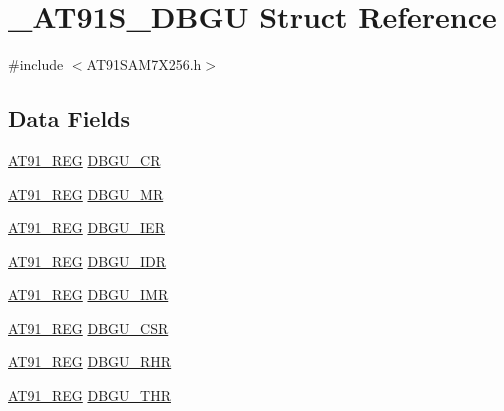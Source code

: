 \hypertarget{struct__AT91S__DBGU}{\section{\-\_\-\-A\-T91\-S\-\_\-\-D\-B\-G\-U Struct Reference}
\label{struct__AT91S__DBGU}
}


{\ttfamily \#include $<$A\-T91\-S\-A\-M7\-X256.\-h$>$}

\subsection*{Data Fields}
\begin{DoxyCompactItemize}
\item 
\hyperlink{GCC_2ARM7__AT91SAM7S_2AT91SAM7X256_8h_a712ad5a1ac1bd02f3e95a7526c283ce1}{A\-T91\-\_\-\-R\-E\-G} \hyperlink{struct__AT91S__DBGU_ac0ec2f327fe14ffd3d8713273ac9a297}{D\-B\-G\-U\-\_\-\-C\-R}
\item 
\hyperlink{GCC_2ARM7__AT91SAM7S_2AT91SAM7X256_8h_a712ad5a1ac1bd02f3e95a7526c283ce1}{A\-T91\-\_\-\-R\-E\-G} \hyperlink{struct__AT91S__DBGU_a6a42e275e70b1489101ce27630a163d3}{D\-B\-G\-U\-\_\-\-M\-R}
\item 
\hyperlink{GCC_2ARM7__AT91SAM7S_2AT91SAM7X256_8h_a712ad5a1ac1bd02f3e95a7526c283ce1}{A\-T91\-\_\-\-R\-E\-G} \hyperlink{struct__AT91S__DBGU_a505e9f99d4497c2731ec97c61e75987b}{D\-B\-G\-U\-\_\-\-I\-E\-R}
\item 
\hyperlink{GCC_2ARM7__AT91SAM7S_2AT91SAM7X256_8h_a712ad5a1ac1bd02f3e95a7526c283ce1}{A\-T91\-\_\-\-R\-E\-G} \hyperlink{struct__AT91S__DBGU_af059becb6730b21339608a53635c78f5}{D\-B\-G\-U\-\_\-\-I\-D\-R}
\item 
\hyperlink{GCC_2ARM7__AT91SAM7S_2AT91SAM7X256_8h_a712ad5a1ac1bd02f3e95a7526c283ce1}{A\-T91\-\_\-\-R\-E\-G} \hyperlink{struct__AT91S__DBGU_a1a30016762e6cf6a1c2d7558b1092f3e}{D\-B\-G\-U\-\_\-\-I\-M\-R}
\item 
\hyperlink{GCC_2ARM7__AT91SAM7S_2AT91SAM7X256_8h_a712ad5a1ac1bd02f3e95a7526c283ce1}{A\-T91\-\_\-\-R\-E\-G} \hyperlink{struct__AT91S__DBGU_abb7191eb0dbf277a2c112a49d6100b6b}{D\-B\-G\-U\-\_\-\-C\-S\-R}
\item 
\hyperlink{GCC_2ARM7__AT91SAM7S_2AT91SAM7X256_8h_a712ad5a1ac1bd02f3e95a7526c283ce1}{A\-T91\-\_\-\-R\-E\-G} \hyperlink{struct__AT91S__DBGU_ab09ba0a9de6924c76075026b2cd29b15}{D\-B\-G\-U\-\_\-\-R\-H\-R}
\item 
\hyperlink{GCC_2ARM7__AT91SAM7S_2AT91SAM7X256_8h_a712ad5a1ac1bd02f3e95a7526c283ce1}{A\-T91\-\_\-\-R\-E\-G} \hyperlink{struct__AT91S__DBGU_ac541e251a8f6e42eddba11eea5c837b9}{D\-B\-G\-U\-\_\-\-T\-H\-R}

\end{DoxyCompactItemize}
